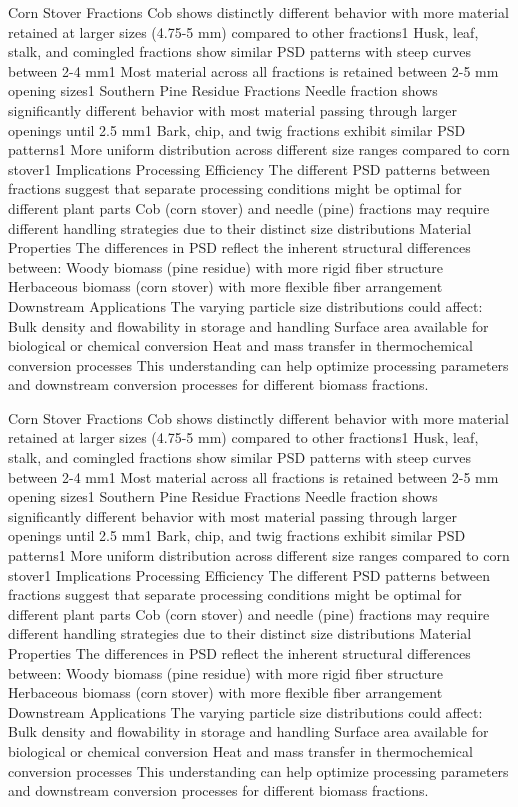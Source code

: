 \documentclass[xcolor=dvipsnames,10pt,hidelinks]{article}
\begin{document}
Corn Stover Fractions
Cob shows distinctly different behavior with more material retained at larger sizes (4.75-5 mm) compared to other fractions1
Husk, leaf, stalk, and comingled fractions show similar PSD patterns with steep curves between 2-4 mm1
Most material across all fractions is retained between 2-5 mm opening sizes1
Southern Pine Residue Fractions
Needle fraction shows significantly different behavior with most material passing through larger openings until 2.5 mm1
Bark, chip, and twig fractions exhibit similar PSD patterns1
More uniform distribution across different size ranges compared to corn stover1
Implications
Processing Efficiency
The different PSD patterns between fractions suggest that separate processing conditions might be optimal for different plant parts
Cob (corn stover) and needle (pine) fractions may require different handling strategies due to their distinct size distributions
Material Properties
The differences in PSD reflect the inherent structural differences between:
Woody biomass (pine residue) with more rigid fiber structure
Herbaceous biomass (corn stover) with more flexible fiber arrangement
Downstream Applications
The varying particle size distributions could affect:
Bulk density and flowability in storage and handling
Surface area available for biological or chemical conversion
Heat and mass transfer in thermochemical conversion processes
This understanding can help optimize processing parameters and downstream conversion processes for different biomass fractions.


Corn Stover Fractions
Cob shows distinctly different behavior with more material retained at larger sizes (4.75-5 mm) compared to other fractions1
Husk, leaf, stalk, and comingled fractions show similar PSD patterns with steep curves between 2-4 mm1
Most material across all fractions is retained between 2-5 mm opening sizes1
Southern Pine Residue Fractions
Needle fraction shows significantly different behavior with most material passing through larger openings until 2.5 mm1
Bark, chip, and twig fractions exhibit similar PSD patterns1
More uniform distribution across different size ranges compared to corn stover1
Implications
Processing Efficiency
The different PSD patterns between fractions suggest that separate processing conditions might be optimal for different plant parts
Cob (corn stover) and needle (pine) fractions may require different handling strategies due to their distinct size distributions
Material Properties
The differences in PSD reflect the inherent structural differences between:
Woody biomass (pine residue) with more rigid fiber structure
Herbaceous biomass (corn stover) with more flexible fiber arrangement
Downstream Applications
The varying particle size distributions could affect:
Bulk density and flowability in storage and handling
Surface area available for biological or chemical conversion
Heat and mass transfer in thermochemical conversion processes
This understanding can help optimize processing parameters and downstream conversion processes for different biomass fractions.
\end{document}
